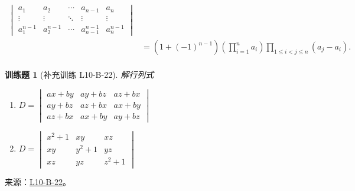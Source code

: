 \documentclass[12pt,fontset=fandol]{ctexart}
\newtheorem{exercise}{训练题}[section]
\begin{document}
\begin{solve}
\begin{align*}
\begin{vmatrix}
                    a_{1}       & a_{2}       & \cdots & a_{n-1}       & a_{n}       \\
                    \vdots      & \vdots      & \ddots & \vdots        & \vdots      \\
                    a_{1}^{n-1} & a_{2}^{n-1} & \cdots & a_{n-1}^{n-1} & a_{n}^{n-1}
                \end{vmatrix}                                     \\
                            & =(1+(-1)^{n-1})\left(\prod_{i=1}^na_i\right)\prod_{1\leqslant i<j\leqslant n}(a_j-a_i). \\
            \end{align*}
\end{solve}

\begin{exercise}[补充训练 L10-B-22]\label{prob:L10-B-22}
解行列式
         \begin{enumerate}
                \item $D=\begin{vmatrix}
                              ax+by & ay+bz & az+bx \\
                              ay+bz & az+bx & ax+by \\
                              az+bx & ax+by & ay+bz
                          \end{vmatrix}$

                \item $D=\begin{vmatrix}
                              x^2+1 & xy    & xz    \\
                              xy    & y^2+1 & yz    \\
                              xz    & yz    & z^2+1
                          \end{vmatrix}$
            \end{enumerate}
\end{exercise}
\noindent 来源：\href{https://github.com/yhwu-is/Linear-Algebra-Left-Undone/blob/new/%E8%AE%B2%E4%B9%89/%E4%B8%93%E9%A2%98/10%20%E8%A1%8C%E5%88%97%E5%BC%8F.tex}{L10-B-22}。
\end{document}
